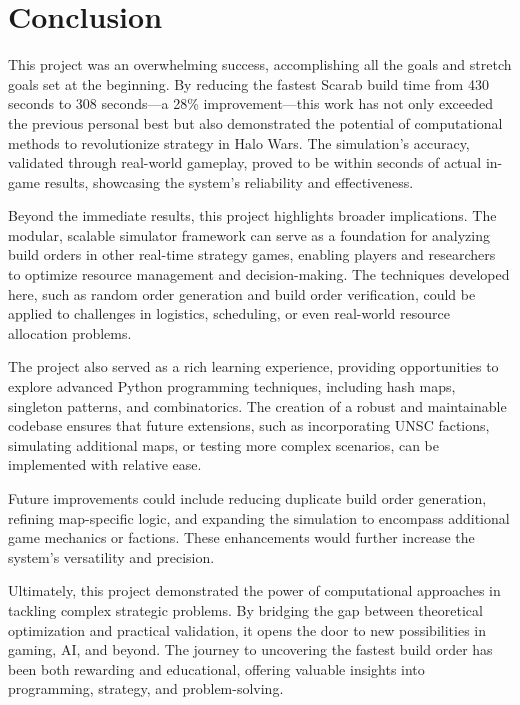 \documentclass[a4paper, 12pt, english]{article}
\begin{document}

\newpage

\section{Conclusion}
This project was an overwhelming success, accomplishing all the goals and stretch goals set at the beginning. By reducing the fastest Scarab build time from 430 seconds to 308 seconds—a 28\% improvement—this work has not only exceeded the previous personal best but also demonstrated the potential of computational methods to revolutionize strategy in Halo Wars. The simulation's accuracy, validated through real-world gameplay, proved to be within seconds of actual in-game results, showcasing the system’s reliability and effectiveness.
\newline

Beyond the immediate results, this project highlights broader implications. The modular, scalable simulator framework can serve as a foundation for analyzing build orders in other real-time strategy games, enabling players and researchers to optimize resource management and decision-making. The techniques developed here, such as random order generation and build order verification, could be applied to challenges in logistics, scheduling, or even real-world resource allocation problems.
\newline

The project also served as a rich learning experience, providing opportunities to explore advanced Python programming techniques, including hash maps, singleton patterns, and combinatorics. The creation of a robust and maintainable codebase ensures that future extensions, such as incorporating UNSC factions, simulating additional maps, or testing more complex scenarios, can be implemented with relative ease.
\newline

Future improvements could include reducing duplicate build order generation, refining map-specific logic, and expanding the simulation to encompass additional game mechanics or factions. These enhancements would further increase the system’s versatility and precision.
\newline

Ultimately, this project demonstrated the power of computational approaches in tackling complex strategic problems. By bridging the gap between theoretical optimization and practical validation, it opens the door to new possibilities in gaming, AI, and beyond. The journey to uncovering the fastest build order has been both rewarding and educational, offering valuable insights into programming, strategy, and problem-solving.
\newline
\end{document}
